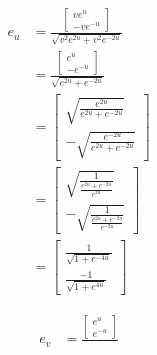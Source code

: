 \documentclass[a4paper, 11pt]{article}
\begin{document}
\begin{enumerate}[label=(\alph*)]
        \begin{minipage}[t]{0.5\textwidth}
          \begin{align*}
            e_u & = \frac{     \begin{bmatrix}
                                 ve^u \\
                                 -ve^{-u}
                               \end{bmatrix}}{
            \sqrt{v^2e^{2u} + v^2e^{-2u}}
            }                                           \\
                & = \frac{     \begin{bmatrix}
                                   e^u \\
                                   -e^{-u}
                                 \end{bmatrix}}{
              \sqrt{e^{2u} + e^{-2u}}
            }                                           \\
                & =    \begin{bmatrix}
                         \sqrt{\frac{e^{2u}}{e^{2u} + e^{-2u}}} \\
                         -\sqrt{\frac{e^{-2u}}{e^{2u} + e^{-2u}}}
                       \end{bmatrix}     \\
                & =    \begin{bmatrix}
                         \sqrt{\frac{1}{\frac{e^{2u} + e^{-2u}}{e^{2u}}}} \\
                         -\sqrt{\frac{1}{\frac{e^{2u} + e^{-2u}}{e^{-2u}}}}
                       \end{bmatrix}    \\
                & =    \begin{bmatrix}
                         \frac{1}{\sqrt{1 + e^{-4u}}} \\
                         \frac{-1}{\sqrt{1 + e^{4u}}}
                       \end{bmatrix}
          \end{align*}
        \end{minipage}\begin{minipage}[t]{0.5\textwidth}
          \begin{align*}
            e_v & = \frac{     \begin{bmatrix}
                                 e^u \\
                                 e^{-u}
                               \end{bmatrix}}{
}
\end{align*}
\end{minipage}
\end{enumerate}
\end{document}
